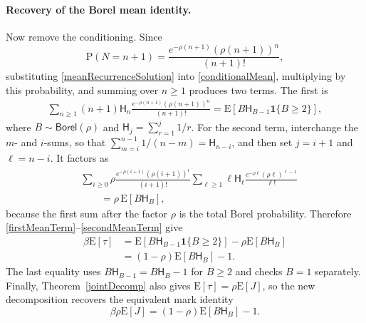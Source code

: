 \documentclass[11pt]{article}
\newcommand{\E}[1]{\mathrm{E}\left[#1\right]}
\newcommand{\PP}[1]{\mathrm{P}\left(#1\right)}
\begin{document}
\paragraph{Recovery of the Borel mean identity.}
Now remove the conditioning. Since
\[
\PP{N=n+1}=\frac{e^{-\rho(n+1)}(\rho(n+1))^n}{(n+1)!},
\]
substituting \eqref{meanRecurrenceSolution} into
\eqref{conditionalMean}, multiplying by this probability, and summing
over $n\ge1$ produces two terms. The first is
\begin{align}
\sum_{n\ge1}(n+1)\mathsf H_n
\frac{e^{-\rho(n+1)}(\rho(n+1))^n}{(n+1)!}
=\E{B\mathsf H_{B-1}\mathbf1\{B\ge2\}},
\label{firstMeanTerm}
\end{align}
where $B\sim\mathsf{Borel}(\rho)$ and
$\mathsf H_j=\sum_{r=1}^j1/r$. For the second term, interchange the
$m$- and $i$-sums, so that
$\sum_{m=i}^{n-1}1/(n-m)=\mathsf H_{n-i}$, and then set
$j=i+1$ and $\ell=n-i$. It factors as
\begin{align}
&\sum_{i\ge0}
\rho\frac{e^{-\rho(i+1)}(\rho(i+1))^i}{(i+1)!}
\sum_{\ell\ge1}\ell\mathsf H_\ell
\frac{e^{-\rho\ell}(\rho\ell)^{\ell-1}}{\ell!}\nonumber\\[-2pt]
&\qquad=\rho\,\E{B\mathsf H_B},
\label{secondMeanTerm}
\end{align}
because the first sum after the factor $\rho$ is the total Borel
probability. Therefore \eqref{firstMeanTerm}--\eqref{secondMeanTerm}
give
\begin{align*}
\beta\E{\tau}
&=\E{B\mathsf H_{B-1}\mathbf1\{B\ge2\}}
-\rho\E{B\mathsf H_B}\\
&=(1-\rho)\E{B\mathsf H_B}-1.
\end{align*}
The last equality uses $B\mathsf H_{B-1}=B\mathsf H_B-1$ for
$B\ge2$ and checks $B=1$ separately. Finally, Theorem~\ref{jointDecomp}
also gives $\E{\tau}=\rho\E{J}$, so the new decomposition recovers
the equivalent mark identity
\begin{equation}\label{markMean}
\beta\rho\E{J}=(1-\rho)\E{B\mathsf H_B}-1.
\end{equation}
\end{document}
